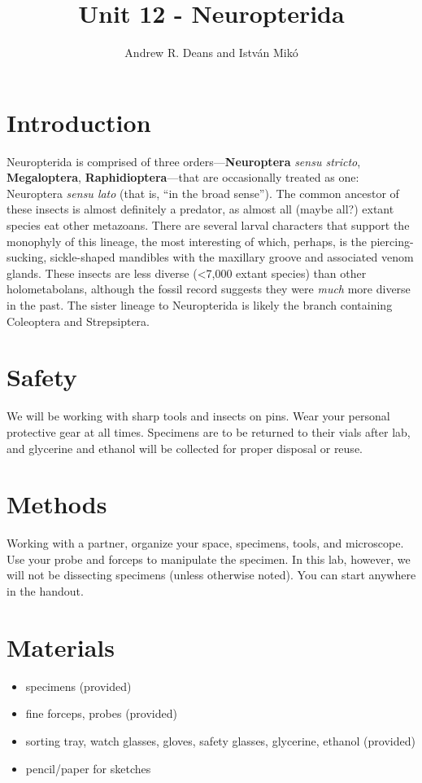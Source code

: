 \documentclass[letterpaper, 11pt]{article}
\title{Unit 12 - Neuropterida}
\author{Andrew R. Deans and Istv\'an Mik\'o}
\begin{document}
\cleanlookdateon %
\maketitle
\thispagestyle{fancy}
\section*{Introduction}
Neuropterida is comprised of three orders---\textbf{Neuroptera} \textit{sensu stricto}, \textbf{Megaloptera}, \textbf{Raphidioptera}---that are occasionally treated as one: Neuroptera \textit{sensu lato} (that is, ``in the broad sense''). The common ancestor of these insects is almost definitely a predator, as almost all (maybe all?) extant species eat other metazoans. There are several larval characters that support the monophyly of this lineage, the most interesting of which, perhaps, is the piercing-sucking, sickle-shaped mandibles with the maxillary groove and associated venom glands. These insects are less diverse (\textless7,000 extant species) than other holometabolans, although the fossil record suggests they were \textit{much} more diverse in the past. The sister lineage to Neuropterida is likely the branch containing Coleoptera and Strepsiptera.

\section*{Safety}
We will be working with sharp tools and insects on pins. Wear your personal protective gear at all times. Specimens are to be returned to their vials after lab, and glycerine and ethanol will be collected for proper disposal or reuse.

\section*{Methods}
Working with a partner, organize your space, specimens, tools, and microscope. Use your probe and forceps to manipulate the specimen. In this lab, however, we will not be dissecting specimens (unless otherwise noted). You can start anywhere in the handout.

\section*{Materials}
\begin{itemize}
\item specimens (provided)
\item fine forceps, probes (provided)
\item sorting tray, watch glasses, gloves, safety glasses, glycerine, ethanol (provided)
\item pencil/paper for sketches
\end{itemize}
\end{document}
